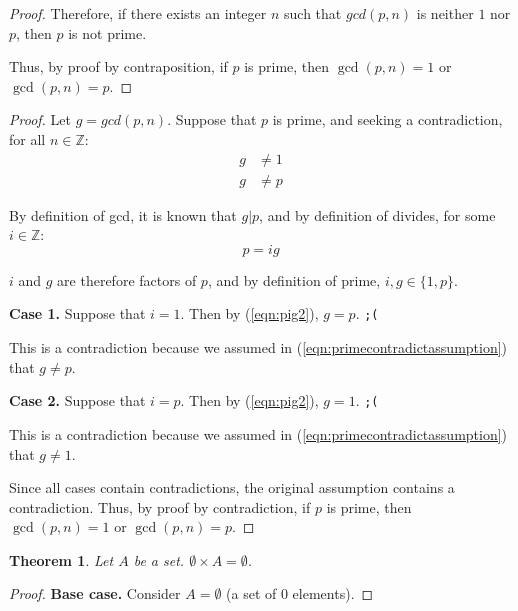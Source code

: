 \documentclass{article}
\newcommand{\contradiction}{\texttt{;(}}
\newtheorem{theorem}{Theorem}
\numberwithin{subcase}{case}
\begin{document}
\begin{outline}[enumerate]
\begin{proof}
                Therefore, if there exists an integer $n$ such that $gcd(p, n)$ is neither $1$ nor $p$, then $p$ is not prime.

                Thus, by proof by contraposition, if $p$ is prime, then $\gcd(p, n) = 1$ or $\gcd(p, n) = p$.
            \end{proof}
        \2 \begin{proof}
                Let $g = gcd(p, n)$. Suppose that $p$ is prime, and seeking a contradiction, for all $n \in \mathbb{Z}$:
                \begin{equation}
                    \begin{aligned}
                        g &\neq 1 \\
                        g &\neq p                        
                    \end{aligned}
                    \label{eqn:primecontradictassumption}
                \end{equation}

                By definition of gcd, it is known that $g | p$, and by definition of divides, for some $i \in \mathbb{Z}$:
                \begin{equation}
                    p = ig
                    \label{eqn:pig2}
                \end{equation}

                $i$ and $g$ are therefore factors of $p$, and by definition of prime, $i, g \in \{1, p\}$.

                \textbf{Case 1.} Suppose that $i = 1$. Then by (\ref{eqn:pig2}), $g = p$. \contradiction

                This is a contradiction because we assumed in (\ref{eqn:primecontradictassumption}) that $g \neq p$.

                \textbf{Case 2.} Suppose that $i = p$. Then by (\ref{eqn:pig2}), $g = 1$. \contradiction

                This is a contradiction because we assumed in (\ref{eqn:primecontradictassumption}) that $g \neq 1$.

                Since all cases contain contradictions, the original assumption contains a contradiction. 
                Thus, by proof by contradiction, if $p$ is prime, then $\gcd(p, n) = 1$ or $\gcd(p, n) = p$.
            \end{proof}

    \1 \begin{theorem}
        Let $A$ be a set. $\emptyset \times A = \emptyset$.
        \label{thm:cartesianemptyset}
    \end{theorem}
    \begin{proof}
        \textbf{Base case.} Consider $A = \emptyset$ (a set of 0 elements). 
        

\end{proof}
\end{outline}
\end{document}
